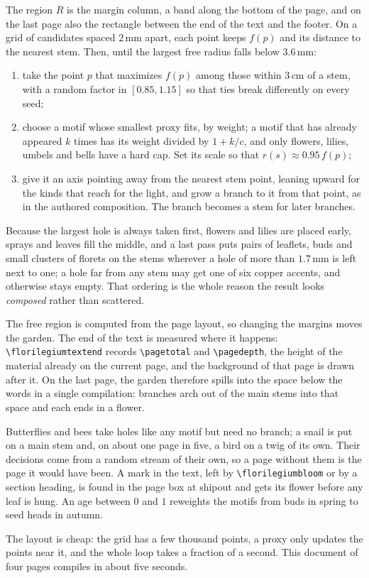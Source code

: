 \begin{construction}[Growth]
The region $R$ is the margin column, a band along the bottom of the page, and on the last
page also the rectangle between the end of the text and the footer. On a grid of candidates
spaced $2\,$mm apart, each point keeps $f(p)$ and its distance to the nearest stem. Then,
until the largest free radius falls below $3.6\,$mm:
\begin{enumerate}
  \item take the point $p$ that maximizes $f(p)$ among those within $3\,$cm of a stem, with
        a random factor in $[0.85,1.15]$ so that ties break differently on every seed;
  \item choose a motif whose smallest proxy fits, by weight; a motif that has already
        appeared $k$ times has its weight divided by $1+k/c$, and only flowers, lilies,
        umbels and bells have a hard cap. Set its scale so that $r(s)\approx0.95\,f(p)$;
  \item give it an axis pointing away from the nearest stem point, leaning upward for the
        kinds that reach for the light, and grow a branch to it from that point, as in the
        authored composition. The branch becomes a stem for later branches.
\end{enumerate}
Because the largest hole is always taken first, flowers and lilies are placed early,
sprays and leaves fill the middle, and a last pass puts pairs of leaflets, buds and small
clusters of florets on the stems wherever a hole of more than $1.7\,$mm is left next to
one; a hole far from any stem may get one of six copper accents, and otherwise stays empty.
That ordering is the whole reason the result looks \emph{composed} rather than scattered.
\end{construction}

\begin{remark}
The free region is computed from the page layout, so changing the margins moves the
garden. The end of the text is measured where it happens: \verb|\florilegiumtextend|
records \verb|\pagetotal| and \verb|\pagedepth|, the height of the material already on the
current page, and the background of that page is drawn after it. On the last page, the
garden therefore spills into the space below the words in a single compilation: branches
arch out of the main stems into that space and each ends in a flower.
\end{remark}

\begin{remark}
Butterflies and bees take holes like any motif but need no branch; a snail is put on a
main stem and, on about one page in five, a bird on a twig of its own. Their decisions come
from a random stream of their own, so a page without them is the page it would have been.
A mark in the text, left by \verb|\florilegiumbloom| or by a section heading, is found in
the page box at shipout and gets its flower before any leaf is hung. An age between $0$
and $1$ reweights the motifs from buds in spring to seed heads in autumn.
\end{remark}

\begin{remark}[Cost]
The layout is cheap: the grid has a few thousand points, a proxy only updates the points
near it, and the whole loop takes a fraction of a second. This document of four pages
compiles in about five seconds.
\end{remark}
